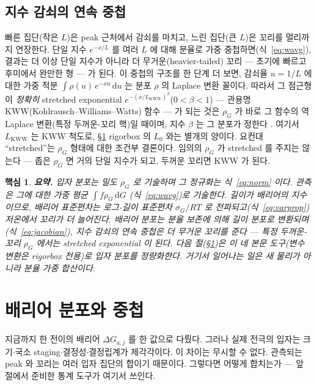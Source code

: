 \documentclass[11pt,a4paper]{article}
\newtheorem*{keybox}{핵심}
\newcommand{\dd}{\mathrm{d}}
\begin{document}
\subsection{지수 감쇠의 연속 중첩}
빠른 집단(작은 $L$)은 peak 근처에서 감쇠를 마치고, 느린 집단(큰 $L$)은 꼬리를 멀리까지 연장한다. 단일 지수
$e^{-x/L}$ 를 여러 $L$ 에 대해 분율로 가중 중첩하면(식~\eqref{eq:wavg}), 결과는 더 이상 단일 지수가 아니라 더
무거운(heavier-tailed) 꼬리 — 초기에 빠르고 후미에서 완만한 형 — 가 된다. 이 중첩의 구조를 한 단계 더 보면, 감쇠율 $u=1/L$ 에 대한 가중 적분 $\int\rho(u)\,e^{-xu}\,\dd u$ 는 분포
$\rho$ 의 Laplace 변환 꼴이다. 따라서 그 점근형이 \emph{정확히} stretched exponential
$e^{-(x/L_{\mathrm{KWW}})^\beta}$($0<\beta<1$) — 관용명 KWW(Kohlrausch--Williams--Watts) 함수 — 가 되는
것은 $\rho_G$ 가 바로 그 함수의 역 Laplace 변환(특정 두꺼운-꼬리 핵)일 때이며, 지수 $\beta$ 는 그 분포가
정한다 \cite{lindsey1980,johnston2006,svare2000}. 여기서 $L_{\mathrm{KWW}}$ 는 KWW 척도로,
\S\ref{sec:dist} rigorbox 의 $L_0$ 와는 별개의 양이다. 요컨대
``stretched''는 $\rho_G$ 형태에 대한 조건부 결론이다. 임의의 $\rho_G$ 가 stretched 를 주지는 않는다 — 좁은
$\rho_G$ 면 거의 단일 지수가 되고, 두꺼운 꼬리면 KWW 가 된다.

\begin{keybox}
\textbf{요약.} 입자 분포는 밀도 $\rho_G$ 로 기술하며 그 정규화는 식~\eqref{eq:norm} 이다. 관측은 그에 대한
가중 평균 $\int f\rho_G\,\dd G$ (식~\eqref{eq:wavg})로 기술한다. 길이가 배리어의 지수이므로, 배리어 표준편차는 로그-길이
표준편차 $\sigma_G/RT$ 로 전파되고(식~\eqref{eq:varprop}) 저온에서 꼬리가 더 늘어진다. 배리어 분포는 분율 보존에
의해 길이 분포로 변환되며(식~\eqref{eq:jacobian}), 지수 감쇠의 연속 중첩은 더 무거운 꼬리를 준다 — 특정 두꺼운-꼬리
$\rho_G$ 에서는 stretched exponential 이 된다. 다음 절(\S\ref{sec:dist})은 이 네 본문 도구(변수 변환은 rigorbox
전용)로 입자 분포를 정량화한다. 거기서 일어나는 일은 새 물리가 아니라 분율 가중 합산이다.
\end{keybox}

\section{배리어 분포와 중첩}\label{sec:dist}
지금까지 한 전이의 배리어 $\Delta G_{a,j}$ 를 한 값으로 다뤘다. 그러나 실제 전극의 입자는 크기$\cdot$국소
staging$\cdot$결정성$\cdot$결정립계가 제각각이다. 이 차이는 무시할 수 없다. 관측되는 peak 와 꼬리는 여러 입자
집단의 합이기 때문이다. 그렇다면 어떻게 합치는가 — 앞 절에서 준비한 통계 도구가 여기서 쓰인다.
\end{document}
